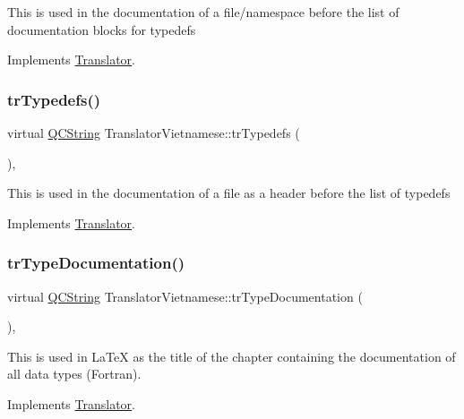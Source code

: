 This is used in the documentation of a file/namespace before the list of documentation blocks for typedefs 

Implements \mbox{\hyperlink{class_translator}{Translator}}.

\mbox{\label{class_translator_vietnamese_ac45d97b2dd04f64806b47571136d86d5}} 
\subsubsection{\texorpdfstring{trTypedefs()}{trTypedefs()}}
{\footnotesize\ttfamily virtual \mbox{\hyperlink{class_q_c_string}{Q\+C\+String}} Translator\+Vietnamese\+::tr\+Typedefs (\begin{DoxyParamCaption}{ }\end{DoxyParamCaption})\hspace{0.3cm}{\ttfamily [inline]}, {\ttfamily [virtual]}}

This is used in the documentation of a file as a header before the list of typedefs 

Implements \mbox{\hyperlink{class_translator}{Translator}}.

\mbox{\label{class_translator_vietnamese_ac4460faa1395d7a6929defead0f8c28b}} 
\subsubsection{\texorpdfstring{trTypeDocumentation()}{trTypeDocumentation()}}
{\footnotesize\ttfamily virtual \mbox{\hyperlink{class_q_c_string}{Q\+C\+String}} Translator\+Vietnamese\+::tr\+Type\+Documentation (\begin{DoxyParamCaption}{ }\end{DoxyParamCaption})\hspace{0.3cm}{\ttfamily [inline]}, {\ttfamily [virtual]}}

This is used in La\+TeX as the title of the chapter containing the documentation of all data types (Fortran). 

Implements \mbox{\hyperlink{class_translator}{Translator}}.

